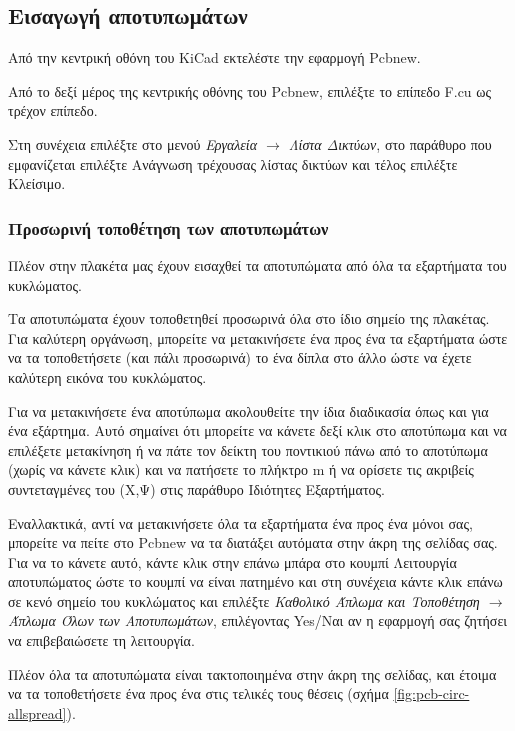\documentclass[a4paper]{article}
\begin{document}

\subsection{Εισαγωγή αποτυπωμάτων}
Από την κεντρική οθόνη του \textenglish{KiCad} εκτελέστε την εφαρμογή Pcbnew. 

Από το δεξί μέρος της κεντρικής οθόνης του Pcbnew, επιλέξτε το επίπεδο F.cu ως τρέχον επίπεδο.

Στη συνέχεια επιλέξτε στο μενού \textit{Εργαλεία $\rightarrow$ Λίστα Δικτύων}, στο παράθυρο που εμφανίζεται επιλέξτε Ανάγνωση τρέχουσας λίστας δικτύων και τέλος επιλέξτε Κλείσιμο.

\subsubsection{Προσωρινή τοποθέτηση των αποτυπωμάτων}
Πλέον στην πλακέτα μας έχουν εισαχθεί τα αποτυπώματα από όλα τα εξαρτήματα του κυκλώματος. 

Τα αποτυπώματα έχουν τοποθετηθεί προσωρινά όλα στο ίδιο σημείο της πλακέτας. Για καλύτερη οργάνωση, μπορείτε να μετακινήσετε ένα προς ένα τα εξαρτήματα ώστε να τα τοποθετήσετε (και πάλι προσωρινά) το ένα δίπλα στο άλλο ώστε να έχετε καλύτερη εικόνα του κυκλώματος. 

Για να μετακινήσετε ένα αποτύπωμα ακολουθείτε την ίδια διαδικασία όπως και για ένα εξάρτημα. Αυτό σημαίνει ότι μπορείτε να κάνετε δεξί κλικ στο αποτύπωμα και να επιλέξετε μετακίνηση ή να πάτε τον δείκτη του ποντικιού πάνω από το αποτύπωμα (χωρίς να κάνετε κλικ) και να πατήσετε το πλήκτρο m ή να ορίσετε τις ακριβείς συντεταγμένες του (Χ,Ψ) στις παράθυρο Ιδιότητες Εξαρτήματος. 

Εναλλακτικά, αντί να μετακινήσετε όλα τα εξαρτήματα ένα προς ένα μόνοι σας, μπορείτε να πείτε στο Pcbnew να τα διατάξει αυτόματα στην άκρη της σελίδας σας. Για να το κάνετε αυτό, κάντε κλικ στην επάνω μπάρα στο κουμπί Λειτουργία αποτυπώματος ώστε το κουμπί να είναι πατημένο και στη συνέχεια κάντε κλικ επάνω σε κενό σημείο του κυκλώματος και επιλέξτε \textit{Καθολικό Άπλωμα και Τοποθέτηση $\rightarrow$ Άπλωμα Όλων των Αποτυπωμάτων}, επιλέγοντας Yes/Ναι αν η εφαρμογή σας ζητήσει να επιβεβαιώσετε τη λειτουργία. 

Πλέον όλα τα αποτυπώματα είναι τακτοποιημένα στην άκρη της σελίδας, και έτοιμα να τα τοποθετήσετε ένα προς ένα στις τελικές τους θέσεις (σχήμα \ref{fig:pcb-circ-allspread}).
\end{document}
